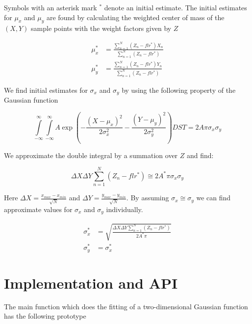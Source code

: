 \documentclass{article}
\begin{document}
Symbols with an asterisk mark $^*$ denote an initial estimate. The initial estimates for $\mu_x$ and $\mu_y$ are found by calculating the weighted center of mass of the $(X,Y)$ sample points with the weight factors given by $Z$ 

\begin{align}
\mu_x^* &= \frac{\sum\limits_{n=1}^N (Z_n-flr^*)X_n}{\sum\limits_{n=1}^N(Z_n-flr^*)}\\
\mu_y^* &= \frac{\sum\limits_{n=1}^N (Z_n-flr^*)Y_n}{\sum\limits_{n=1}^N(Z_n-flr^*)}
\end{align}

We find initial estimates for $\sigma_x$ and $\sigma_y$ by using the following property of the Gaussian function 

\begin{equation}
\int\limits_{-\infty}^{\infty}\int\limits_{-\infty}^{\infty}A\exp(-\frac{(X-\mu_x)^2}{2\sigma_x^2}-\frac{(Y-\mu_y)^2}{2\sigma_y^2})DST=2A\pi\sigma_x\sigma_y
\end{equation}

We approximate the double integral by a summation over $Z$ and find:

\begin{equation}
\Delta X\Delta Y\sum\limits_{n=1}^N(Z_n-flr^*) \cong 2A^*\pi\sigma_x\sigma_y
\end{equation}

Here $\Delta X = \frac{x_{max}-x_{min}}{\sqrt{N}}$ and $\Delta Y = \frac{y_{max}-y_{min}}{\sqrt{N}}$. By assuming $\sigma_x\cong\sigma_y$ we can find approximate values for $\sigma_x$ and $\sigma_y$ individually.


\begin{align}
\sigma_x^* &= \sqrt{\frac{\Delta X\Delta Y\sum\limits_{n=1}^N(Z_n-flr^*)}{2A^*\pi}}\\
\sigma_y^* &= \sigma_x^*
\end{align}

\section{Implementation and API}

The main function which does the fitting of a two-dimensional Gaussian function has the following prototype
\end{document}

